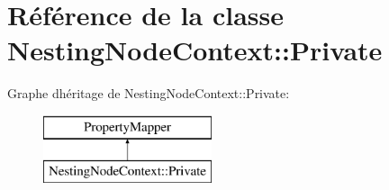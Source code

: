 \hypertarget{class_nesting_node_context_1_1_private}{}\section{Référence de la classe Nesting\+Node\+Context\+:\+:Private}
\label{class_nesting_node_context_1_1_private}
Graphe d\textquotesingle{}héritage de Nesting\+Node\+Context\+:\+:Private\+:\begin{figure}[H]
\begin{center}
\leavevmode
\includegraphics[height=2.000000cm]{class_nesting_node_context_1_1_private}
\end{center}
\end{figure}
